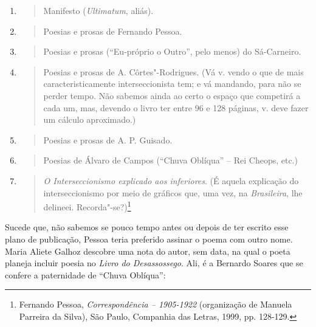 \begin{enumerate}
\def\labelenumi{\arabic{enumi}.}
\item
  \begin{quote}
  Manifesto (\emph{Ultimatum}, aliás).
  \end{quote}
\item
  \begin{quote}
  Poesias e prosas de Fernando Pessoa.
  \end{quote}
\item
  \begin{quote}
  Poesias e prosas (``Eu-próprio o Outro'', pelo menos) do Sá-Carneiro.
  \end{quote}
\item
  \begin{quote}
  Poesias e prosas de A. Côrtes"-Rodrigues. (Vá v. vendo o que de mais
  caracteristicamente interseccionista tem; e vá mandando, para não se
  perder tempo. Não sabemos ainda ao certo o espaço que competirá a cada
  um, mas, devendo o livro ter entre 96 e 128 páginas, v. deve fazer um
  cálculo aproximado.)
  \end{quote}
\item
  \begin{quote}
  Poesias e prosas de A. P. Guisado.
  \end{quote}
\item
  \begin{quote}
  Poesias de Álvaro de Campos (``Chuva Oblíqua'' -- Rei Cheops, etc.)
  \end{quote}
\item
  \begin{quote}
  \emph{O Interseccionismo explicado aos inferiores}. (É aquela
  explicação do interseccionismo por meio de gráficos que, uma vez, na
  \emph{Brasileira}, lhe delineei. Recorda"-se?)\footnote{Fernando
    Pessoa, \emph{Correspondência -- 1905-1922} (organização de Manuela
    Parreira da Silva), São Paulo, Companhia das Letras, 1999, pp.
    128-129.}
  \end{quote}
\end{enumerate}

Sucede que, não sabemos se pouco tempo antes ou depois de ter escrito
esse plano de publicação, Pessoa teria preferido assinar o poema com
outro nome. Maria Aliete Galhoz descobre uma nota do autor, sem data, na
qual o poeta planeja incluir poesia no \emph{Livro do Desassossego}.
Ali, é a Bernardo Soares que se confere a paternidade de ``Chuva
Oblíqua'':

